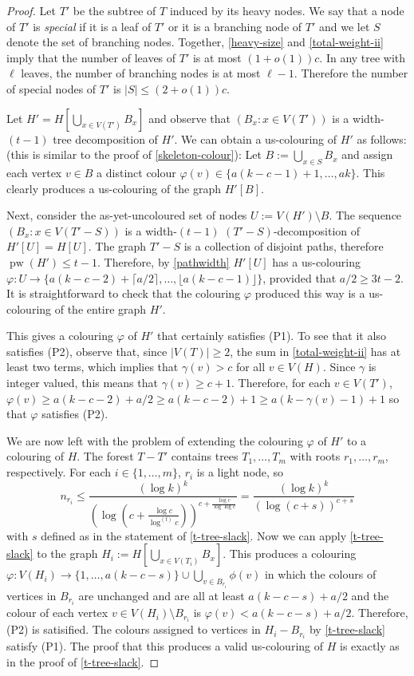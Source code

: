 \documentclass[kpfonts]{patmorin}
\DeclareMathOperator{\pw}{pw}
\theoremstyle{named}
\begin{document}
\begin{proof}
    Let $T'$ be the subtree of $T$ induced by its heavy nodes.  We say that a node of $T'$ is \emph{special} if it is a leaf of $T'$ or it is a branching node of $T'$ and we let $S$ denote the set of branching nodes.  Together, \cref{heavy-size} and \cref{total-weight-ii} imply that the number of leaves of $T'$ is at most $(1+o(1))c$.  In any tree with $\ell$ leaves, the number of branching nodes is at most $\ell-1$.  Therefore the number of special nodes of $T'$ is $|S|\le (2+o(1))c$.

    Let $H'=H[\bigcup_{x\in V(T')} B_x]$ and observe that $(B_x:x\in V(T'))$ is a width-$(t-1)$ tree decomposition of $H'$.  We can obtain a us-colouring of $H'$ as follows: (this is similar to the proof of \cref{skeleton-colour}):  Let $B:=\bigcup_{x\in S} B_x$ and assign each vertex  $v\in B$ a distinct colour $\varphi(v)\in\{a(k-c-1)+1,\ldots,ak\}$.  This clearly produces a us-colouring of the graph $H'[B]$.

    Next, consider the as-yet-uncoloured set of nodes $U:=V(H')\setminus B$. The sequence $(B_x:x\in V(T'-S))$ is a width-$(t-1)$ $(T'-S)$-decomposition of $H'[U]=H[U]$. The graph $T'-S$ is a collection of disjoint paths, therefore $\pw(H')\le t-1$. Therefore, by \cref{pathwidth} $H'[U]$ has a us-colouring $\varphi:U\to \{a(k-c-2)+\lceil a/2\rceil,\ldots,\lfloor a(k-c-1)\rfloor\}$, provided that $a/2\ge 3t-2$.  It is straightforward to check that the colouring $\varphi$ produced this way is a us-colouring of the entire graph $H'$.

    This gives a colouring $\varphi$ of $H'$ that certainly satisfies (P1).  To see that it also satisfies (P2), observe that, since $|V(T)|\ge 2$, the sum in \cref{total-weight-ii} has at least two terms, which implies that $\gamma(v) > c$ for all $v\in V(H)$. Since $\gamma$ is integer valued, this means that $\gamma(v)\ge c+1$.  Therefore, for each $v\in V(T')$, $\varphi(v)\ge a(k-c-2)+a/2 \ge a(k-c-2)+1\ge a(k-\gamma(v)-1)+1$ so that $\varphi$ satisfies (P2).

    We are now left with the problem of extending the colouring $\varphi$ of $H'$ to a colouring of $H$.  The forest $T-T'$ contains trees $T_1,\ldots,T_m$ with roots $r_1,\ldots,r_m$, respectively.  For each $i\in\{1,\ldots,m\}$, $r_i$ is a light node, so
    \[
        n_{r_i} \le \frac{(\log k)^k}{\left(\log\left(c + \frac{\log c}{\log^{(t)} c}\right)\right)^{c+\frac{\log c}{\log\log c}}}
        = \frac{(\log k)^k}{\left(\log\left(c + s\right)\right)^{c+s}}
    \]
    with $s$ defined as in the statement of \cref{t-tree-slack}.
    Now we can apply \cref{t-tree-slack} to the graph $H_{i}:=H[\bigcup_{x\in V(T_{i})} B_x]$.  This produces a colouring $\varphi:V(H_i)\to\{1,\ldots,a(k-c-s)\}\cup \bigcup_{v\in B_{r_i}}\phi(v)$ in which the colours of vertices in $B_{r_i}$ are unchanged and are all at least $a(k-c-s)+a/2$ and the colour of each vertex $v\in V(H_i)\setminus B_{r_i}$ is $\varphi(v)<a(k-c-s)+a/2$.  Therefore, (P2) is satisified.  The colours assigned to vertices in $H_i-B_{r_i}$ by \cref{t-tree-slack} satisfy (P1).
    The proof that this produces a valid us-colouring of $H$ is exactly as in the proof of \cref{t-tree-slack}.
\end{proof}
\end{document}
